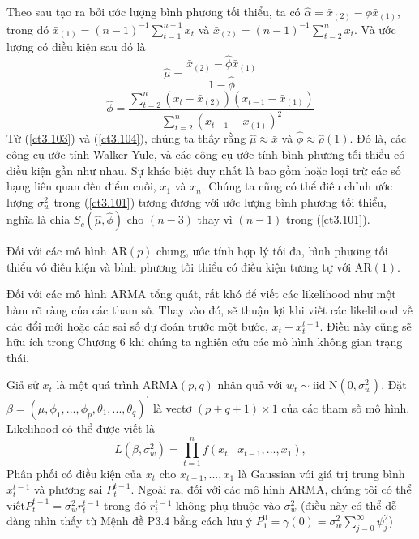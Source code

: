 \documentclass[12pt, a4paper,oneside]{book}
\theoremstyle{definition}
\begin{document}
Theo sau tạo ra bởi ước lượng bình phương tối thiểu, ta có $\hat{\alpha}=\bar{x}_{(2)}-\phi \bar{x}_{(1)}$, trong đó $\bar{x}_{(1)}=(n-1)^{-1}\sum_{t=1}^{n-1}x_{t}$ và $\bar{x}_{(2)}=(n-1)^{-1}\sum_{t=2}^{n}x_{t}$. Và ước lượng có điều kiện sau đó là
\begin{equation}
\hat{\mu}=\dfrac{\bar{x}_{(2)}-\hat{\phi}\bar{x}_{(1)}}{1-\hat{\phi}} \label{ct3.103}
\end{equation}
\begin{equation}
\hat{\phi}=\dfrac{\sum_{t=2}^{n}(x_{t}-\bar{x}_{(2)})(x_{t-1}-\bar{x}_{(1)})}{\sum_{t=2}^{n}(x_{t-1}-\bar{x}_{(1)})^{2}} \label{ct3.104}
\end{equation}
Từ (\ref{ct3.103}) và (\ref{ct3.104}), chúng ta thấy rằng $\hat{\mu}\approx \bar{x}$ và $\hat{\phi}\approx \hat{\rho}(1)$. Đó là, các công cụ ước tính Walker Yule, và các công cụ ước tính bình phương tối thiểu có điều kiện gần như nhau. Sự khác biệt duy nhất là bao gồm hoặc loại trừ các số hạng liên quan đến điểm cuối, $x_{1}$ và $x_{n}$. Chúng ta cũng có thể điều chỉnh ước lượng $\sigma^{2}_{w}$ trong (\ref{ct3.101}) tương đương với ước lượng bình phương tối thiểu, nghĩa là chia $S_{c}(\hat{\mu},\hat{\phi})$ cho $(n - 3)$ thay vì $(n - 1)$ trong (\ref{ct3.101}). 

Đối với các mô hình AR$(p)$ chung, ước tính hợp lý tối đa, bình phương tối thiểu vô điều kiện và bình phương tối thiểu có điều kiện  tương tự với AR$(1)$.

Đối với các mô hình ARMA tổng quát, rất khó để viết các likelihood như một hàm rõ ràng của các tham số. Thay vào đó, sẽ thuận lợi khi viết các likelihood về các đổi mới hoặc các sai số dự đoán trước một bước, $ x_{t}-x_{t}^{t-1} $. Điều này cũng sẽ hữu ích trong Chương 6 khi chúng ta nghiên cứu các mô hình không gian trạng thái.

Giả sử $x_{t}$ là một quá trình ARMA$ (p,q) $ nhân quả  với $ w_{t}\sim \text{iid N}(0,\sigma_{w}^2) $. Đặt $ \beta=(\mu,\phi_{1},...,\phi_{p},\theta_{1},...,\theta_{q})^{\prime} $ là vectơ $ (p + q + 1) \times 1 $ của các tham số mô hình.  Likelihood có thể được viết là
$$ L(\beta,\sigma_{w}^2)=\prod_{t=1}^{n} f(x_{t}\mid x_{t-1},...,x_{1}), $$
Phân phối có điều kiện của $ x_{t} $ cho $x_{t-1},...,x_{1} $ là Gaussian với giá trị trung bình $ x_{t}^{t-1} $ và phương sai $ P_{t}^{t-1} $. Ngoài ra, đối với các mô hình ARMA, chúng tôi có thể viết$ P_{t}^{t-1}=\sigma_{w}^2 r_{t}^{t-1} $ trong đó $ r_{t}^{t-1} $ không phụ thuộc vào $ \sigma_{w}^2 $ (điều này có thể dễ dàng nhìn thấy từ Mệnh đề P3.4 bằng cách lưu ý $ P^0_1=\gamma(0)=\sigma_{w}^2\sum_{j=0}^{\infty}\psi^2_j $)
\end{document}

